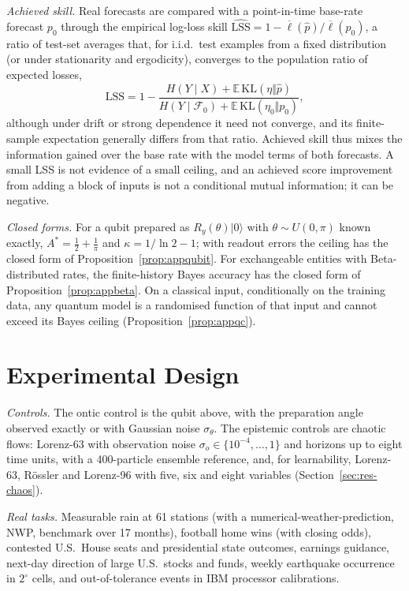 \documentclass[journal]{IEEEtran}
\theoremstyle{definition}
\newcommand{\E}{\mathbb{E}}
\newcommand{\F}{\mathcal{F}}
\newcommand{\LSS}{\mathrm{LSS}}
\newcommand{\KL}{\mathrm{KL}}
\begin{document}
\emph{Achieved skill.} Real forecasts are compared with a point-in-time base-rate forecast $p_0$ through the empirical log-loss skill $\widehat{\LSS}=1-\overline{\ell}(\hat p)/\overline{\ell}(p_0)$, a ratio of test-set averages that, for i.i.d.\ test examples from a fixed distribution (or under stationarity and ergodicity), converges to the population ratio of expected losses,
\begin{equation}\label{eq:lss}
\LSS=1-\frac{H(Y\mid X)+\E\,\KL(\eta\Vert\hat p)}{H(Y\mid\F_0)+\E\,\KL(\eta_0\Vert p_0)},
\end{equation}
although under drift or strong dependence it need not converge, and its finite-sample expectation generally differs from that ratio. Achieved skill thus mixes the information gained over the base rate with the model terms of both forecasts. A small LSS is not evidence of a small ceiling, and an achieved score improvement from adding a block of inputs is not a conditional mutual information; it can be negative.

\emph{Closed forms.} For a qubit prepared as $R_y(\theta)\lvert0\rangle$ with $\theta\sim U(0,\pi)$ known exactly, $A^*=\tfrac12+\tfrac1\pi$ and $\kappa=1/\ln2-1$; with readout errors the ceiling has the closed form of Proposition~\ref{prop:appqubit}. For exchangeable entities with Beta-distributed rates, the finite-history Bayes accuracy has the closed form of Proposition~\ref{prop:appbeta}. On a classical input, conditionally on the training data, any quantum model is a randomised function of that input and cannot exceed its Bayes ceiling (Proposition~\ref{prop:appqc}).

\section{Experimental Design}\label{sec:design}
\emph{Controls.} The ontic control is the qubit above, with the preparation angle observed exactly or with Gaussian noise $\sigma_\theta$. The epistemic controls are chaotic flows: Lorenz-63 with observation noise $\sigma_o\in\{10^{-4},\ldots,1\}$ and horizons up to eight time units, with a 400-particle ensemble reference, and, for learnability, Lorenz-63, R\"ossler and Lorenz-96 with five, six and eight variables (Section~\ref{sec:res-chaos}).

\emph{Real tasks.} Measurable rain at 61 stations (with a numerical-weather-prediction, NWP, benchmark over 17 months), football home wins (with closing odds), contested U.S.\ House seats and presidential state outcomes, earnings guidance, next-day direction of large U.S.\ stocks and funds, weekly earthquake occurrence in $2^\circ$ cells, and out-of-tolerance events in IBM processor calibrations.
\end{document}
